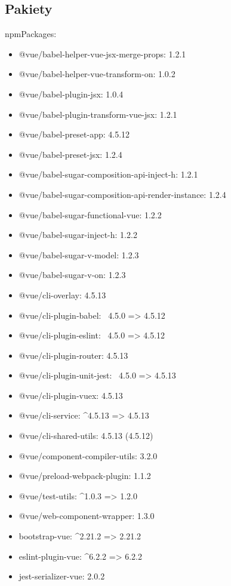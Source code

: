 \documentclass{article}
\begin{document}
\subsection{Pakiety}
    npmPackages:
\begin{itemize}
    \item @vue/babel-helper-vue-jsx-merge-props:  1.2.1
    \item @vue/babel-helper-vue-transform-on:  1.0.2
    \item @vue/babel-plugin-jsx:  1.0.4
    \item @vue/babel-plugin-transform-vue-jsx:  1.2.1
    \item @vue/babel-preset-app:  4.5.12
    \item @vue/babel-preset-jsx:  1.2.4
    \item @vue/babel-sugar-composition-api-inject-h:  1.2.1
    \item @vue/babel-sugar-composition-api-render-instance:  1.2.4
    \item @vue/babel-sugar-functional-vue:  1.2.2
    \item @vue/babel-sugar-inject-h:  1.2.2
    \item @vue/babel-sugar-v-model:  1.2.3
    \item @vue/babel-sugar-v-on:  1.2.3
    \item @vue/cli-overlay:  4.5.13
    \item @vue/cli-plugin-babel: ~4.5.0 => 4.5.12
    \item @vue/cli-plugin-eslint: ~4.5.0 => 4.5.12
    \item @vue/cli-plugin-router:  4.5.13
    \item @vue/cli-plugin-unit-jest: ~4.5.0 => 4.5.13
    \item @vue/cli-plugin-vuex:  4.5.13
    \item @vue/cli-service: \^{}4.5.13 => 4.5.13
    \item @vue/cli-shared-utils:  4.5.13 (4.5.12)
    \item @vue/component-compiler-utils:  3.2.0
    \item @vue/preload-webpack-plugin:  1.1.2
    \item @vue/test-utils: \^{}1.0.3 => 1.2.0
    \item @vue/web-component-wrapper:  1.3.0
    \item bootstrap-vue: \^{}2.21.2 => 2.21.2
    \item eslint-plugin-vue: \^{}6.2.2 => 6.2.2
    \item jest-serializer-vue:  2.0.2

\end{itemize}
\end{document}
